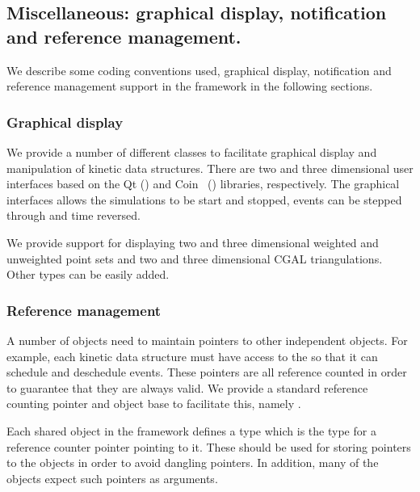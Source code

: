 \subsection{Miscellaneous: graphical display, notification and reference management.}
\label{sec:misc}

We describe some coding conventions used, graphical display,
notification and reference management support in the framework in the
following sections.


\subsubsection{Graphical display}

We provide a number of different classes to facilitate graphical
display and manipulation of kinetic data structures. There are two and
three dimensional user interfaces based on the Qt
() and Coin~\cite{coin}
() libraries,
respectively.  The graphical interfaces allows the simulations to be
start and stopped, events can be stepped through and time reversed.

We provide support for displaying two and three dimensional weighted
and unweighted point sets and two and three dimensional CGAL
triangulations. Other types can be easily added.

\subsubsection{Reference management}

A number of objects need to maintain pointers to other independent
objects. For example, each kinetic data structure must have access to
the  so that it can schedule and deschedule events. These
pointers are all reference counted in order to guarantee that they are
always valid. We provide a standard reference counting pointer and
object base to facilitate this, namely 
\cite{cheriton}.

Each shared object in the framework defines a type  which is the
type for a reference counter pointer pointing to it. These should be
used for storing pointers to the objects in order to avoid dangling
pointers. In addition, many of the objects expect such pointers as
arguments.

